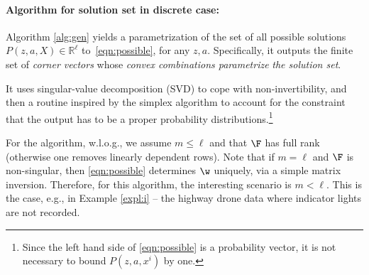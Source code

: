 \documentclass[letterpaper]{article} %
\theoremstyle{definition}%
\theoremstyle{definition}
\newcommand{\out}{z}
\newcommand{\todo}[1]{\textcolor{red}{#1}}
\begin{document}

\paragraph{Algorithm for solution set in discrete case:}
Algorithm \ref{alg:gen} yields a parametrization of the set of all possible solutions $P(\out, a, X) \in \mathbb{R}^\ell$ to~\eqref{eqn:possible}, for any $\out, a$. Specifically, it outputs the finite set of \emph{corner vectors} whose \emph{convex combinations parametrize} \emph{the solution set}.

It uses singular-value decomposition (SVD) to cope with non-invertibility, and then a routine inspired by the simplex algorithm to account for the constraint that the output has to be a proper probability distributions.\footnote{Since the left hand side of \eqref{eqn:possible} is a probability vector, it is not necessary to bound $P(z, a, x^i)$ by one.}

For the algorithm, w.l.o.g., we assume $m \leq \ell$ and that $\F$ has full rank (otherwise one removes linearly dependent rows).
Note that if $m=\ell$ and $\F$ is non-singular, then %
\eqref{eqn:possible} determines $\w$ uniquely, via a simple matrix inversion.
Therefore, for this algorithm, the interesting scenario is %
	$m<\ell$. This is the case, e.g., in Example \ref{expl:i} -- the highway drone data where indicator lights are not recorded.
\end{document}
